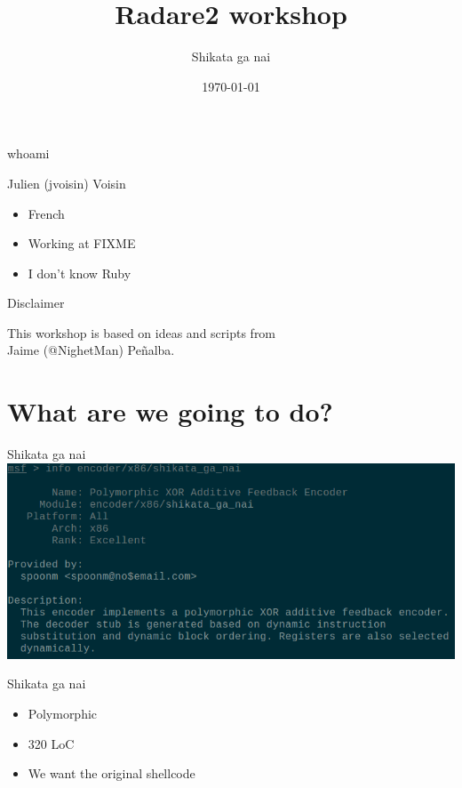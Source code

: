\documentclass{beamer}
\title{Radare2 workshop}
\author{Shikata ga nai}
\date{\today}
\institute{hack.lu 2015}
\begin{document}
\maketitle

\begin{frame}{whoami}
	\begin{block}{Julien (jvoisin) Voisin}
	\begin{itemize}
		\item French
		\item Working at FIXME
		\item I don't know Ruby
	\end{itemize}
	\end{block}
\end{frame}

\begin{frame}{Disclaimer}
	\begin{center}
		This workshop is based on ideas and scripts from\\
		Jaime (\alert{@NighetMan}) Peñalba.
	\end{center}
\end{frame}

\section{What are we going to do?}

\begin{frame}{Shikata ga nai}
	\includegraphics[width=\textwidth]{description.png}
\end{frame}

\begin{frame}{Shikata ga nai}
	\begin{itemize}
		\item Polymorphic
		\item 320 LoC
		\item We want the original shellcode
	\end{itemize}
\end{frame}
\end{document}
